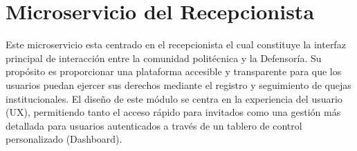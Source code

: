 
\section{Microservicio del Recepcionista}
\label{sec:modulo_recepcionista}

Este microservicio esta centrado en el recepcionista el cual constituye la interfaz principal de interacción entre la comunidad politécnica y la Defensoría. 
Su propósito es proporcionar una plataforma accesible y transparente para que los usuarios puedan ejercer sus derechos mediante el registro y seguimiento de quejas institucionales. El diseño de este módulo se centra en la experiencia del usuario (UX), permitiendo tanto el acceso rápido para invitados como una gestión más detallada para usuarios autenticados a través de un tablero de control personalizado (Dashboard).


%
%
%
%